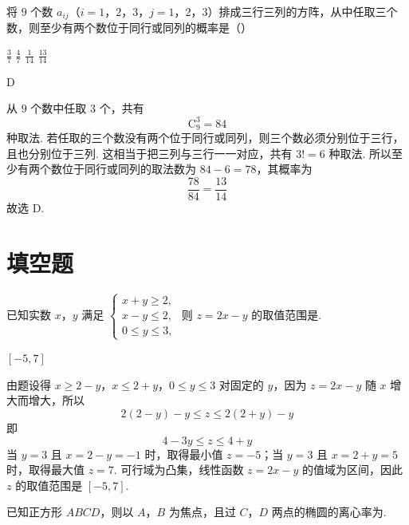 \begin{problem}
将 \(9\) 个数 \(a_{ij}\)（\(i = 1\)，\(2\)，\(3\)，\(j = 1\)，\(2\)，\(3\)）排成三行三列的方阵，从中任取三个数，则至少有两个数位于同行或同列的概率是（\quad）

\choices
    {\(\frac{3}{7}\)}
    {\(\frac{4}{7}\)}
    {\(\frac{1}{14}\)}
    {\(\frac{13}{14}\)}
\end{problem}

\begin{answer}
D
\end{answer}

\begin{solution}
从 \(9\) 个数中任取 \(3\) 个，共有
\[
\mathrm C_9^3=84
\]
种取法. 若任取的三个数没有两个位于同行或同列，则三个数必须分别位于三行，且也分别位于三列. 这相当于把三列与三行一一对应，共有 \(3!=6\) 种取法. 所以至少有两个数位于同行或同列的取法数为 \(84-6=78\)，其概率为
\[
\frac{78}{84}=\frac{13}{14}
\]
故选 D.
\end{solution}

\section{填空题}

\begin{problem}
已知实数 \(x\)，\(y\) 满足 \(\begin{cases}
x + y \geqslant 2,\\
x - y \leqslant 2,\\
0 \leqslant y \leqslant 3,
\end{cases}\) 则 \(z = 2x - y\) 的取值范围是\fillinblank{}.
\end{problem}

\begin{answer}
\(\left[-5, 7\right]\)
\end{answer}

\begin{solution}
由题设得
\(x\geqslant2-y\)，\(x\leqslant2+y\)，\(0\leqslant y\leqslant3\)
对固定的 \(y\)，因为 \(z=2x-y\) 随 \(x\) 增大而增大，所以
\[
2(2-y)-y\leqslant z\leqslant2(2+y)-y
\]
即
\[
4-3y\leqslant z\leqslant4+y
\]
当 \(y=3\) 且 \(x=2-y=-1\) 时，取得最小值 \(z=-5\)；当 \(y=3\) 且 \(x=2+y=5\) 时，取得最大值 \(z=7\). 可行域为凸集，线性函数 \(z=2x-y\) 的值域为区间，因此 \(z\) 的取值范围是 \([-5,7]\).
\end{solution}

\begin{problem}
已知正方形 \(ABCD\)，则以 \(A\)，\(B\) 为焦点，且过 \(C\)，\(D\) 两点的椭圆的离心率为\fillinblank{}.
\end{problem}

